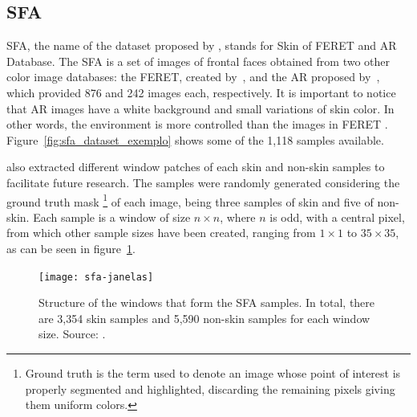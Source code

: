 \subsection{SFA}
\label{sec:datasets_sfa}
SFA, the name of the dataset proposed by \citet{sfa-skin-dataset:13}, stands for Skin of FERET and AR Database. The SFA is a set of images of frontal faces obtained from two other color image databases: the FERET, created by~\citet{feret:96}, and the AR proposed by~\citet{ar-face-database:98}, which provided 876 and 242 images each, respectively. It is important to notice that AR images have a white background and small variations of skin color. In other words, the environment is more controlled than the images in FERET \cite{sfa-skin-dataset:13}. Figure~\ref{fig:sfa_dataset_exemplo} shows some of the 1,118 samples available.

\citet{sfa-skin-dataset:13} also extracted different window patches of each skin and non-skin samples to facilitate future research. The samples were randomly generated considering the ground truth mask \footnote{Ground truth is the term used to denote an image whose point of interest is properly segmented and highlighted, discarding the remaining pixels giving them uniform colors.} of each image, being three samples of skin and five of non-skin. Each sample is a window of size $n \times n$, where $n$ is odd, with a central pixel, from which other sample sizes have been created, ranging from $1 \times 1$ to $35 \times 35$, as can be seen in figure~\ref{fig:sfa_dataset_janelas}.

\begin{figure}[H]
  \centering
  \texttt{[image: sfa-janelas]}
  \caption[Structure of the windows that form the SFA samples]{Structure of the windows that form the SFA samples. In total, there are 3,354 skin samples and 5,590 non-skin samples for each window size. Source: \citet{sfa-skin-dataset:13}.}
  \label{fig:sfa_dataset_janelas}
\end{figure}

